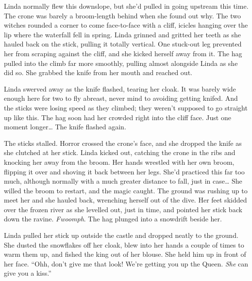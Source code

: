 Linda normally flew this downslope, but she'd pulled in going upstream this time.
The crone was barely a broom-length behind when she found out why.
The two witches rounded a corner to come face-to-face with a cliff, icicles hanging over the lip where the waterfall fell in spring.
Linda grinned and gritted her teeth as she hauled back on the stick, pulling it totally vertical.
One stuck-out leg prevented her from scraping against the cliff, and she kicked herself away from it.
The hag pulled into the climb far more smoothly, pulling almost alongside Linda as she did so.
She grabbed the knife from her mouth and reached out.

Linda swerved away as the knife flashed, tearing her cloak.
It was barely wide enough here for two to fly abreast, never mind to avoiding getting knifed.
And the sticks were losing speed as they climbed; they weren't supposed to go straight up like this.
The hag soon had her crowded right into the cliff face.
Just one moment longer{\dots}
The knife flashed again.

The sticks stalled.
Horror crossed the crone's face, and she dropped the knife as she clutched at her stick.
Linda kicked out, catching the crone in the ribs and knocking her away from the broom.
Her hands wrestled with her own broom, flipping it over and shoving it back between her legs.
She'd practiced this far too much, although normally with a much greater distance to fall, just in case{\dots}
She willed the broom to restart, and the magic caught.
The ground was rushing up to meet her and she hauled back, wrenching herself out of the dive.
Her feet skidded over the frozen river as she levelled out, just in time, and pointed her stick back down the ravine.
\emph{Fwoomph}.
The hag plunged into a snowdrift beside her.

\storybreak

Linda pulled her stick up outside the castle and dropped neatly to the ground.
She dusted the snowflakes off her cloak, blew into her hands a couple of times to warm them up, and fished the king out of her blouse.
She held him up in front of her face.
``Ohh, don't give me that look!
We're getting you up the Queen.
\emph{She} can give you a kiss.''
